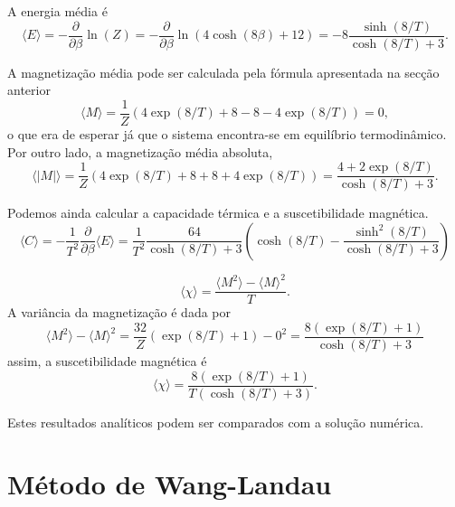 \documentclass[12pt, a4paper]{article}
\begin{document}
	A energia média é
	\begin{equation}
		\langle E \rangle = - \frac{\partial}{\partial \beta} \ln(Z) = - \frac{\partial}{\partial \beta} \ln(4 \cosh(8 \beta) + 12)
		= -8 \frac{\sinh(8/T)}{\cosh(8/T) + 3}.
	\end{equation}
	
	A magnetização média pode ser calculada pela fórmula apresentada na secção anterior
	\begin{equation}
		\langle M \rangle = \frac{1}{Z} \left( 4\exp(8/T) + 8 -8 -4\exp(8/T) \right) = 0,
	\end{equation}
	o que era de esperar já que o sistema encontra-se em equilíbrio termodinâmico. Por outro lado, a magnetização média absoluta,
	\begin{equation}
		\langle |M| \rangle = \frac{1}{Z} \left( 4\exp(8/T) + 8 +8 +4\exp(8/T) \right) = \frac{4 + 2\exp(8/T)}{\cosh(8/T) + 3}.
	\end{equation}
	
	Podemos ainda calcular a capacidade térmica e a suscetibilidade magnética. 
	\begin{equation}
		\langle  C \rangle = - \frac{1}{T^2} \frac{\partial }{\partial \beta} \langle E \rangle = \frac{1}{T^2} \frac{64}{\cosh(8/T)+3} \left( \cosh(8/T) - \frac{\sinh^2(8/T)}{\cosh(8/T) + 3} \right)
	\end{equation}
	
	\begin{equation}
		\langle  \chi \rangle  = \frac{\langle M^2 \rangle - \langle M \rangle^2}{T}.
	\end{equation}
	A variância da magnetização é dada por
	\begin{equation}
		\langle M^2 \rangle - \langle M \rangle^2 = \frac{32}{Z} \left( \exp(8/T) + 1 \right) - 0^2 = \frac{8(\exp(8/T) + 1)}{\cosh(8/T) + 3}
	\end{equation}
	assim, a suscetibilidade magnética é
	\begin{equation}
		\langle  \chi \rangle = \frac{8(\exp(8/T) + 1)}{T(\cosh(8/T) + 3)}.
	\end{equation}
	
	Estes resultados analíticos podem ser comparados com a solução numérica.
	
	\pagebreak
	
	\section{Método de Wang-Landau}
	
\end{document}
